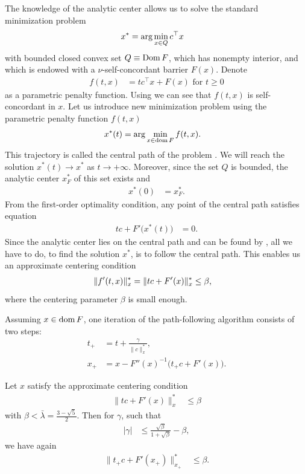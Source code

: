 The knowledge of the analytic center allows us to solve the standard minimization problem
\begin{align}
  x^* &= \arg\min_{x\in Q} c^\top x \labeleq{SDP:scb:standardProblem}
\end{align}
with bounded closed convex set $Q \equiv \operatorname{Dom} F$, which has nonempty interior, and which is endowed with a $\nu$-self-concordant barrier $F(x)$.
Denote
\begin{align}
  f(t,x) &= tc^\top x + F(x) \text{ for } t \geq 0
\end{align}
as a parametric penalty function.
Using  we can see that $f(t,x)$ is self-concordant in $x$.
Let us introduce new minimization problem using the parametric penalty function $f(t,x)$
\begin{align}
  x^*(t) &= \arg\min_{x\in\dom F} f(t,x).\labeleq{SDP:scb:centralPath}
\end{align}
This trajectory is called the central path of the problem .
We will reach the solution $x^*(t) \rightarrow x^*$ as $t \rightarrow +\infty$.
Moreover, since the set $Q$ is bounded, the analytic center $x^*_F$ of this set exists and
\begin{align}
  x^*(0) &= x^*_F.
\end{align}
From the first-order optimality condition, any point of the central path satisfies equation
\begin{align}
  tc + F'\big(x^*(t)\big) &= 0.
\end{align}
Since the analytic center lies on the central path and can be found by , all we have to do, to find the solution $x^*$, is to follow the central path. 
This enables us an approximate centering condition
\begin{align}
  \|f'(t,x)\|^*_x = \|tc + F'(x)\|^*_x &\leq \beta, \labeleq{SDP:scb:cntrCondition}
\end{align}
where the centering parameter $\beta$ is small enough.

Assuming $x\in\operatorname{dom} F$, one iteration of the path-following algorithm consists of two steps:
\begin{align}
  t_+ &= t + \frac{\gamma}{\|c\|^*_x},\\
  x_+ &= x - F''(x)^{-1}\big(t_+c+F'(x)\big).
\end{align}

\begin{theorem}
  Let $x$ satisfy the approximate centering condition 
  \begin{align}
    \|tc + F'(x)\|^*_x &\leq \beta
  \end{align}
  with $\beta < \bar{\lambda} = \frac{3-\sqrt{5}}{2}$.
  Then for $\gamma$, such that
  \begin{align}
    |\gamma| &\leq \frac{\sqrt{\beta}}{1+\sqrt{\beta}} - \beta,
  \end{align}
  we have again
  \begin{align}
    \|t_+c + F'(x_+)\|^*_{x_+} &\leq \beta.
  \end{align}
\end{theorem}

